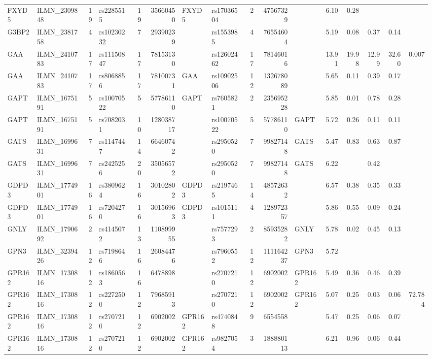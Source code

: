 \documentclass{article}
\begin{document}
\begin{landscape}
{\begin{ThreePartTable}
\begin{longtable}{|llr|lrrl|lrrl|rrrr|r|}
FXYD5 & ILMN\_2309848 & 19 & rs2285515 & 19 & 35660450 & FXYD5 & rs17036504 & 2 & 47567329 &  & 6.10 & 0.28 &  &  &  \\
G3BP2 & ILMN\_2381758 & 4 & rs10230232 & 7 & 29390239 &  & rs1553985 & 4 & 76554604 &  & 5.19 & 0.08 & 0.37 & 0.14 &  \\
GAA & ILMN\_2410783 & 17 & rs11150847 & 17 & 78153130 &  & rs12602462 & 17 & 78146016 &  & 13.91 & 19.98 & 12.99 & 32.60 & 0.007 \\
GAA & ILMN\_2410783 & 17 & rs8068856 & 17 & 78100731 & GAA & rs10902506 & 12 & 132678089 &  & 5.65 & 0.11 & 0.39 & 0.17 &  \\
GAPT & ILMN\_1675191 & 5 & rs10070522 & 5 & 57786110 & GAPT & rs7605821 & 2 & 235695228 &  & 5.85 & 0.01 & 0.78 & 0.28 &  \\
GAPT & ILMN\_1675191 & 5 & rs7082031 & 10 & 128038717 &  & rs10070522 & 5 & 57786110 & GAPT & 5.72 & 0.26 & 0.11 & 0.11 &  \\
GATS & ILMN\_1699631 & 7 & rs1147447 & 14 & 66460742 &  & rs2950520 & 7 & 99827148 & GATS & 5.47 & 0.83 & 0.63 & 0.87 &  \\
GATS & ILMN\_1699631 & 7 & rs2425256 & 20 & 35056572 &  & rs2950520 & 7 & 99827148 & GATS & 6.22 &  & 0.42 &  &  \\
GDPD3 & ILMN\_1774901 & 16 & rs3809624 & 16 & 30102802 & GDPD3 & rs2197465 & 14 & 48572632 &  & 6.57 & 0.38 & 0.35 & 0.33 &  \\
GDPD3 & ILMN\_1774901 & 16 & rs7204270 & 16 & 30156963 & GDPD3 & rs1015111 & 4 & 128972357 &  & 5.86 & 0.55 & 0.09 & 0.24 &  \\
GNLY & ILMN\_1790692 & 2 & rs4145072 & 13 & 110899955 &  & rs7577293 & 2 & 85935282 & GNLY & 5.78 & 0.02 & 0.45 & 0.13 &  \\
GPN3 & ILMN\_3239426 & 12 & rs7198646 & 16 & 26084476 &  & rs7960552 & 12 & 111164237 & GPN3 & 5.72 &  &  &  &  \\
GPR162 & ILMN\_1730816 & 12 & rs1860563 & 16 & 6478898 &  & rs2707210 & 12 & 6902002 & GPR162 & 5.49 & 0.36 & 0.46 & 0.39 &  \\
GPR162 & ILMN\_1730816 & 12 & rs2272500 & 12 & 79685913 &  & rs2707210 & 12 & 6902002 & GPR162 & 5.07 & 0.25 & 0.03 & 0.06 & 72.784 \\
GPR162 & ILMN\_1730816 & 12 & rs2707210 & 12 & 6902002 & GPR162 & rs4740848 & 9 & 6554558 &  & 5.47 & 0.25 & 0.06 & 0.07 &  \\
GPR162 & ILMN\_1730816 & 12 & rs2707210 & 12 & 6902002 & GPR162 & rs9827054 & 3 & 188880113 &  & 6.21 & 0.96 & 0.06 & 0.44 &  \\

\end{longtable}
\end{ThreePartTable}}
\end{landscape}
\end{document}
